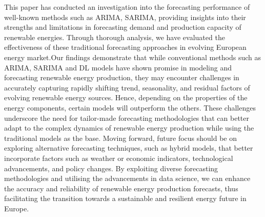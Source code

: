 \documentclass[acmtog]{acmart}
\begin{document}
This paper has conducted an investigation into the forecasting performance of well-known methods such as ARIMA, SARIMA, providing insights into their strengths and limitations in forecasting demand and production capacity of renewable energies. Through thorough analysis, we have evaluated the effectiveness of these traditional forecasting approaches in evolving European energy market.Our findings demonstrate that while conventional methods such as ARIMA, SARIMA and DL models have shown promise in modeling and forecasting renewable energy production, they may encounter challenges in accurately capturing rapidly shifting trend, seasonality, and residual factors of evolving renewable energy sources. Hence, depending on the properties of the energy components, certain models will outperform the others. These challenges underscore the need for tailor-made forecasting methodologies that can better adapt to the complex dynamics of renewable energy production while using the traditional models as the base.
Moving forward, future focus should be on exploring alternative forecasting techniques, such as hybrid models, that better incorporate factors such as weather or economic indicators, technological advancements, and policy changes. By exploiting diverse forecasting methodologies and utilising the advancements in data science, we can enhance the accuracy and reliability of renewable energy production forecasts, thus facilitating the transition towards a sustainable and resilient energy future in Europe.




\end{document}

